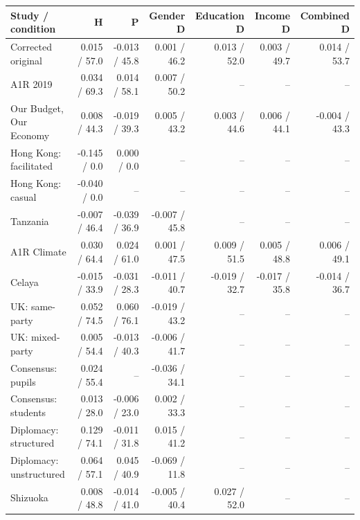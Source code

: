 
\begin{tabular}{lrrrrrr}
\toprule
Study / condition & H & P & Gender D & Education D & Income D & Combined D\\
\midrule
Corrected original & 0.015 / 57.0 & -0.013 / 45.8 & 0.001 / 46.2 & 0.013 / 52.0 & 0.003 / 49.7 & 0.014 / 53.7\\
A1R 2019 & 0.034 / 69.3 & 0.014 / 58.1 & 0.007 / 50.2 & -- & -- & --\\
Our Budget, Our Economy & 0.008 / 44.3 & -0.019 / 39.3 & 0.005 / 43.2 & 0.003 / 44.6 & 0.006 / 44.1 & -0.004 / 43.3\\
Hong Kong: facilitated & -0.145 / 0.0 & 0.000 / 0.0 & -- & -- & -- & --\\
Hong Kong: casual & -0.040 / 0.0 & -- & -- & -- & -- & --\\
\addlinespace
Tanzania & -0.007 / 46.4 & -0.039 / 36.9 & -0.007 / 45.8 & -- & -- & --\\
A1R Climate & 0.030 / 64.4 & 0.024 / 61.0 & 0.001 / 47.5 & 0.009 / 51.5 & 0.005 / 48.8 & 0.006 / 49.1\\
Celaya & -0.015 / 33.9 & -0.031 / 28.3 & -0.011 / 40.7 & -0.019 / 32.7 & -0.017 / 35.8 & -0.014 / 36.7\\
UK: same-party & 0.052 / 74.5 & 0.060 / 76.1 & -0.019 / 43.2 & -- & -- & --\\
UK: mixed-party & 0.005 / 54.4 & -0.013 / 40.3 & -0.006 / 41.7 & -- & -- & --\\
\addlinespace
Consensus: pupils & 0.024 / 55.4 & -- & -0.036 / 34.1 & -- & -- & --\\
Consensus: students & 0.013 / 28.0 & -0.006 / 23.0 & 0.002 / 33.3 & -- & -- & --\\
Diplomacy: structured & 0.129 / 74.1 & -0.011 / 31.8 & 0.015 / 41.2 & -- & -- & --\\
Diplomacy: unstructured & 0.064 / 57.1 & 0.045 / 40.9 & -0.069 / 11.8 & -- & -- & --\\
Shizuoka & 0.008 / 48.8 & -0.014 / 41.0 & -0.005 / 40.4 & 0.027 / 52.0 & -- & --\\
\bottomrule
\end{tabular}
